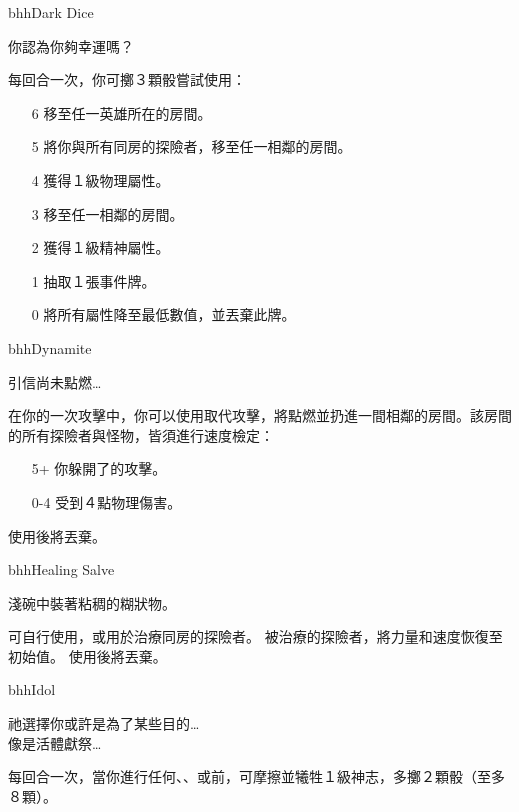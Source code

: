 \begin{ItemCard}{bhh}{Dark Dice}{}
	\begin{CardStory}
		你認為你夠幸運嗎？
	\end{CardStory}
	每回合一次，你可擲３顆骰嘗試使用\ThisName{}：
	\begin{itemize}
		\item[6] 移至任一英雄所在的房間。
		\item[5] 將你與所有同房的探險者，移至任一相鄰的房間。
		\item[4] 獲得１級物理屬性。
		\item[3] 移至任一相鄰的房間。
		\item[2] 獲得１級精神屬性。
		\item[1] 抽取１張事件牌。
		\item[0] 將所有屬性降至最低數值，並丟棄此牌。
	\end{itemize}
\end{ItemCard}%
\linebreak[0]%
\begin{ItemCard}{bhh}{Dynamite}{}
	\begin{CardStory}
		引信尚未點燃…
	\end{CardStory}
	在你的一次攻擊中，你可以使用\ThisName{}取代攻擊，將\ThisName{}點燃並扔進一間相鄰的房間。該房間的所有探險者與怪物，皆須進行速度檢定：
	\begin{itemize}
		\item[5+] 你躲開了\ThisName{}的攻擊。
		\item[0-4] 受到４點物理傷害。
	\end{itemize}
	使用後將\ThisName{}丟棄。\smallbreak
\end{ItemCard}%
\linebreak[0]%
\begin{ItemCard}{bhh}{Healing Salve}{}
	\begin{CardStory}
		淺碗中裝著粘稠的糊狀物。
	\end{CardStory}
	可自行使用，或用於治療同房的探險者。\smallbreak
	被\ThisName{}治療的探險者，將力量和速度恢復至初始值。\smallbreak
	使用後將\ThisName{}丟棄。\smallbreak
\end{ItemCard}%
\linebreak[0]%
\begin{ItemCard}{bhh}{Idol}{}
	\begin{CardStory}
		祂選擇你或許是為了某些目的…\\
		像是活體獻祭…
	\end{CardStory}
	每回合一次，當你進行任何、、或前，可摩擦\ThisName{}並犧牲１級神志，多擲２顆骰（至多８顆）。\smallbreak
\end{ItemCard}%

